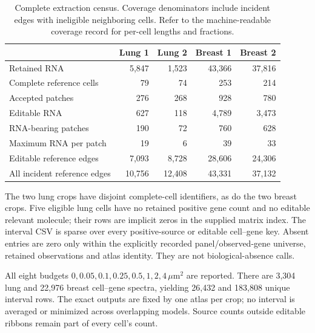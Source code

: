 \documentclass[10pt,letterpaper]{article}
\begin{document}
\begin{table}[ht]\centering
\begin{tabular}{lrrrr}\toprule
 &Lung 1&Lung 2&Breast 1&Breast 2\\\midrule
Retained RNA&5,847&1,523&43,366&37,816\\
Complete reference cells&79&74&253&214\\
Accepted patches&276&268&928&780\\
Editable RNA&627&118&4,789&3,473\\
RNA-bearing patches&190&72&760&628\\
Maximum RNA per patch&19&6&39&33\\
Editable reference edges&7,093&8,728&28,606&24,306\\
All incident reference edges&10,756&12,408&43,331&37,132\\\bottomrule
\end{tabular}
\caption{Complete extraction census. Coverage denominators include incident edges with ineligible neighboring cells. Refer to the machine-readable coverage record for per-cell lengths and fractions.}
\end{table}

The two lung crops have disjoint complete-cell identifiers, as do the two breast crops. Five eligible lung cells have no retained positive gene count and no editable relevant molecule; their rows are implicit zeros in the supplied matrix index. The interval CSV is sparse over every positive-source or editable cell--gene key. Absent entries are zero only within the explicitly recorded panel/observed-gene universe, retained observations and atlas identity. They are not biological-absence calls.

All eight budgets $0,0.05,0.1,0.25,0.5,1,2,4\,\mu\mathrm m^2$ are reported. There are 3,304 lung and 22,976 breast cell--gene spectra, yielding 26,432 and 183,808 unique interval rows. The exact outputs are fixed by one atlas per crop; no interval is averaged or minimized across overlapping models. Source counts outside editable ribbons remain part of every cell's count.
\end{document}
